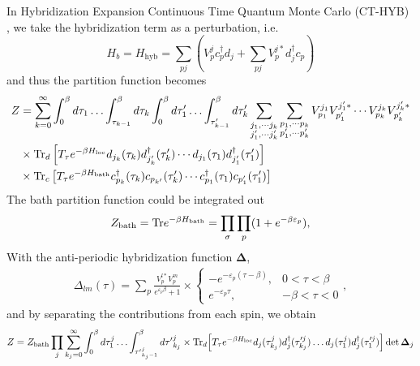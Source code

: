 In Hybridization Expansion Continuous Time Quantum Monte Carlo (CT-HYB)
\cite{RevModPhys.83.349,PhysRevB.75.155113,PhysRevB.80.235117,
PhysRevB.74.155107}, 
we take the hybridization term as a perturbation, i.e.
\begin{equation}
H_b=H_\text{hyb} = \sum_{pj} (V_p^j c_{p}^\dagger d_j
+ \sum_{pj} V_p^{j*}d_j^\dagger c_{p})
\end{equation}
and thus the partition function becomes
\begin{align}
Z &=\sum_{k=0}^\infty\int_0^\beta d\tau_1 \ldots \int_{\tau_{k-1}}^\beta d\tau_k 
    \int_0^\beta d\tau_1' \ldots  \int_{\tau_{k-1}'}^\beta d\tau_k' 
\sum_{\substack{j_1, \cdots j_k\\j_1', \cdots j_k'}}\sum_{\substack{p_1, \cdots p_k\\p_1',\cdots p_k'}} V^{j_1}_{p_1}V^{j_1'*}_{p_1'} \cdots V^{j_k}_{p_k}V^{j_k'*}_{p_k'}  \nonumber\\
&\times\text{Tr}_d\left[T_\tau e^{-\beta H_\text{loc}} d_{j_k}(\tau_k) d_{j_k'}^\dagger(\tau_k')\cdots d_{j_1}(\tau_1)d_{j_1'}^\dagger(\tau_1')\right] \nonumber\\
&\times\text{Tr}_c\left[T_\tau e^{-\beta H_\text{bath}} c^\dagger_{p_k}(\tau_k)c_{p_{k'}}(\tau_k')\cdots c_{p_1}^\dagger(\tau_1) c_{p_1'}(\tau_1')\right]
\end{align}
The bath partition function could be integrated out
\begin{align}
Z_\text{bath} = \text{Tr} e^{-\beta H_\text{bath}} = \prod_\sigma \prod_{p} (1+e^{-\beta \varepsilon_{p}}),
\end{align}
With the anti-periodic hybridization function $\mathbf{\Delta}$,
\begin{align}
\Delta_{lm}(\tau) = \sum_p \frac{V^{l*}_p V^m_p}{e^{\varepsilon_p\beta}+1} \times 
\left\{ 
\begin{array}{ll}-e^{-\varepsilon_p(\tau-\beta)},& 0<\tau<\beta \\ 
e^{-\varepsilon_p\tau},&  -\beta<\tau<0\end{array}
\right.,
\end{align}
and by separating the contributions from each spin, we obtain
\begin{equation}
\label{partition_function}
Z =  Z_\text{bath}\prod_j \sum_{k_j=0}^\infty \int_0^\beta d\tau^j_1 \ldots \int_{{\tau'}^j_{k_j-1}}^\beta d{\tau'}^j_{k_j} 
\times \text{Tr}_d\Big[T_\tau e^{-\beta H_\text{loc}} d_j(\tau^j_{k_j}) d_j^\dagger(\tau'^j_{k_j})\ldots d_j(\tau^j_{1})d_j^\dagger(\tau'^j_1)\Big] \det \mathbf{\Delta}_j
\end{equation}

